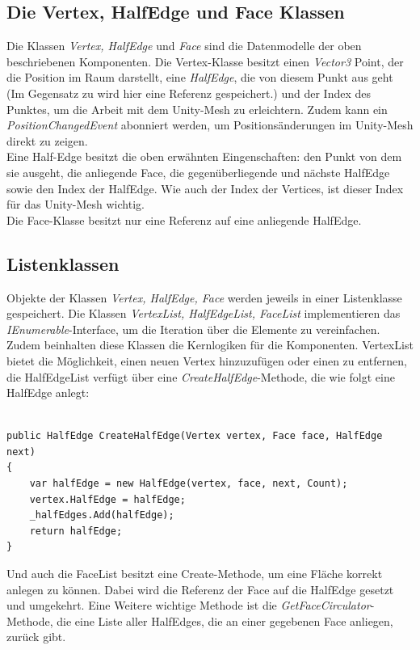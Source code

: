 \subsection{Die Vertex, HalfEdge und Face Klassen}
Die Klassen \textit{Vertex, HalfEdge} und \textit{Face} sind die Datenmodelle der oben beschriebenen Komponenten. Die Vertex-Klasse besitzt einen \textit{Vector3} Point, der die Position im Raum darstellt, eine \textit{HalfEdge}, die von diesem Punkt aus geht (Im Gegensatz zu \cite{Meshmash2017} wird hier eine Referenz gespeichert.) und der Index des Punktes, um die Arbeit mit dem Unity-Mesh zu erleichtern. Zudem kann ein \textit{PositionChangedEvent} abonniert werden, um Positions\"anderungen im Unity-Mesh direkt zu zeigen.
\\
Eine Half-Edge besitzt die oben erw\"ahnten Eingenschaften: den Punkt von dem sie ausgeht, die anliegende Face, die gegen\"uberliegende und n\"achste HalfEdge sowie den Index der HalfEdge. Wie auch der Index der Vertices, ist dieser Index f\"ur das Unity-Mesh wichtig.
\\
Die Face-Klasse besitzt nur eine Referenz auf eine anliegende HalfEdge.

\subsection{Listenklassen}
Objekte der Klassen \textit{Vertex, HalfEdge, Face} werden jeweils in einer Listenklasse gespeichert. Die Klassen \textit{VertexList, HalfEdgeList, FaceList} implementieren das \textit{IEnumerable}-Interface, um die Iteration \"uber die Elemente zu vereinfachen. Zudem beinhalten diese Klassen die Kernlogiken f\"ur die Komponenten. VertexList bietet die M\"oglichkeit, einen neuen Vertex hinzuzuf\"ugen oder einen zu entfernen, die HalfEdgeList verf\"ugt \"uber eine  \textit{CreateHalfEdge}-Methode, die wie folgt eine HalfEdge anlegt:

\begin{lstlisting}

public HalfEdge CreateHalfEdge(Vertex vertex, Face face, HalfEdge next)
{
	var halfEdge = new HalfEdge(vertex, face, next, Count);
	vertex.HalfEdge = halfEdge;
	_halfEdges.Add(halfEdge);
	return halfEdge;
}

\end{lstlisting}

Und auch die FaceList besitzt eine Create-Methode, um eine Fl\"ache korrekt anlegen zu k\"onnen. Dabei wird die Referenz der Face auf die HalfEdge gesetzt und umgekehrt. Eine Weitere wichtige Methode ist die \textit{GetFaceCirculator}-Methode, die eine Liste aller HalfEdges, die an einer gegebenen Face anliegen, zur\"uck gibt.

